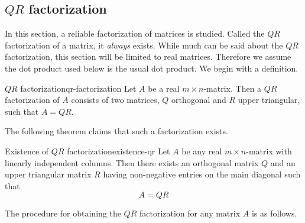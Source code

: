 \subsection{$QR$ factorization}

In this section, a reliable factorization of matrices is studied. Called the $QR$ factorization of a matrix, it \textit{always} exists. While much can be said about the $QR$ factorization, this section will be limited to real matrices. Therefore we assume the dot product used below is the usual dot product. We begin with a definition. 

\begin{definition}{$QR$ factorization}{qr-factorization}
Let $A$ be a real $m\times n$-matrix. Then a $QR$ factorization of $A$ consists
of two matrices, $Q$ orthogonal and $R$ upper
triangular, such that $A=QR$. 
\end{definition}

The following theorem claims that such a factorization exists. 

\begin{theorem}{Existence of $QR$ factorization}{existence-qr}
Let $A$ be any real $m\times n$-matrix with linearly independent columns. Then there exists an orthogonal
matrix $Q$ and an upper triangular matrix $R$ having non-negative entries
on the main diagonal such that
\begin{equation*}
A=QR
\end{equation*}
\end{theorem}

The procedure for obtaining the $QR$ factorization for any matrix $A$ is as follows.

